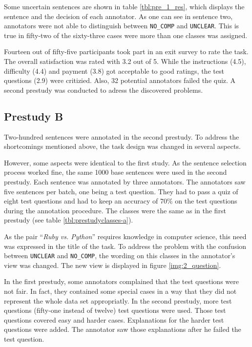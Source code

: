 Some uncertain sentences are shown in table \ref{tbl:pre_1_res}, which displays the sentence and the decision of each annotator. As one can see in sentence two, annotators were not able to distinguish between \texttt{NO\_COMP} and \texttt{UNCLEAR}. This is true in fifty-two of the sixty-three cases were more than one classes was assigned.\newline

Fourteen out of fifty-five participants took part in an exit survey to rate the task. The overall satisfaction was rated with 3.2 out of 5. While the instructions (4.5), difficulty (4.4) and payment (3.8) got acceptable to good ratings, the test questions (2.9) were critizied. Also, 32 potential annotators failed the quiz. A second prestudy was conducted to adress the discovered problems.



\subsection{Prestudy B}
Two-hundred sentences were annotated in the second prestudy. To address the shortcomings mentioned above, the task design was changed in several aspects.

However, some aspects were identical to the first study. As the sentence selection process worked fine, the same 1000 base sentences were used in the second prestudy.  Each sentence was annotated by three annotators. The annotators saw five sentences per batch, one being a test question. They had to pass a quiz of eight test questions and had to keep an accuracy of 70\% on the test questions during the annotation procedure. The classes were the same as in the first prestudy (see table \ref{tbl:prestudyclasses-a}).

As the pair \enquote{\emph{Ruby vs. Python}} requires knowledge in computer science, this need was expressed in the title of the task.
To address the problem with the confusion between \texttt{UNCLEAR} and \texttt{NO\_COMP}, the wording on this classes in the annotator's view was changed. The new view is displayed in figure \ref{img:2_question}. 

In the first prestudy, some annotators complained that the test questions were not fair. In fact, they contained some special cases in a way that they did not represent the whole data set appropriatly. In the second prestudy, more test questions (fifty-one instead of twelve) test questions were used. Those test questions covered easy and harder cases. Explanations for the harder test questions were added. The annotator saw those explanations after he failed the test question.

